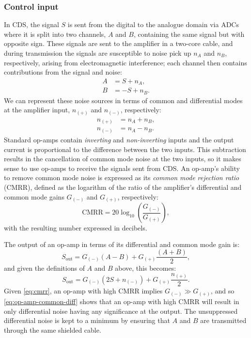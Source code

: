 \subsubsection{Control input}
In \gls{CDS}, the signal $S$ is sent from the digital to the analogue domain via \glspl{ADC} where it is split into two channels, $A$ and $B$, containing the same signal but with opposite sign. These signals are sent to the amplifier in a two-core cable, and during transmission the signals are susceptible to noise pick up $n_{A}$ and $n_{B}$, respectively, arising from electromagnetic interference; each channel then contains contributions from the signal and noise:
\begin{align}
  A &= S + n_{A}, \\
  B &= -S + n_{B}.
\end{align}
We can represent these noise sources in terms of common and differential modes at the amplifier input, $n_{\left(+\right)}$ and $n_{\left(-\right)}$, respectively:
\begin{align}
  n_{\left(+\right)} &= n_{A} + n_{B}, \\
  n_{\left(-\right)} &= n_{A} - n_{B}.
\end{align}
Standard op-amps contain \emph{inverting} and \emph{non-inverting} inputs and the output current is proportional to the difference between the two inputs. This subtraction results in the cancellation of common mode noise at the two inputs, so it makes sense to use op-amps to receive the signals sent from \gls{CDS}. An op-amp's ability to remove common mode noise is expressed as its \emph{common mode rejection ratio} (\gls{CMRR}), defined as the logarithm of the ratio of the amplifier's differential and common mode gains $G_{\left( - \right)}$ and $G_{\left( + \right)}$, respectively:
\begin{equation}
  \label{eq:cmrr}
  \text{CMRR} = 20 \log_{10} \left( \frac{G_{\left(-\right)}}{G_{\left(+\right)}} \right),
\end{equation}
with the resulting number expressed in decibels.

The output of an op-amp in terms of its differential and common mode gain is:
\begin{equation}
  S_{\text{out}} = G_{\left(-\right)} \left(A - B\right) + G_{\left(+\right)} \frac{\left(A + B\right)}{2},
\end{equation}
and given the definitions of $A$ and $B$ above, this becomes:
\begin{equation}
  \label{eq:op-amp-common-diff}
  S_{\text{out}} = G_{\left(-\right)} \left(2S + n_{\left(-\right)}\right) + G_{\left(+\right)} \frac{n_{\left(+\right)}}{2}.
\end{equation}
Given \cref{eq:cmrr}, an op-amp with high \gls{CMRR} implies $G_{\left(-\right)} \gg G_{\left(+\right)}$, and so \cref{eq:op-amp-common-diff} shows that an op-amp with high \gls{CMRR} will result in only differential noise having any significance at the output. The unsuppressed differential noise is kept to a minimum by ensuring that $A$ and $B$ are transmitted through the same shielded cable.

